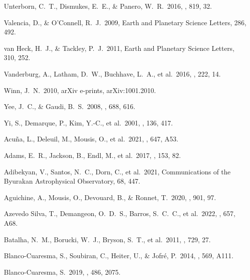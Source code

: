  Unterborn, C.~T., Dismukes, E.~E., \& Panero, W.~R.\ 2016, \apj, 819, 32.

 Valencia, D., \& O'Connell, R.~J.\ 2009, Earth and Planetary Science Letters, 286, 492.

 van Heck, H.~J., \& Tackley, P.~J.\ 2011, Earth and Planetary Science Letters, 310, 252.

 Vanderburg, A., Latham, D.~W., Buchhave, L.~A., et al.\ 2016, \apjs, 222, 14.

 Winn, J.~N.\ 2010, arXiv e-prints, arXiv:1001.2010.

 Yee, J.~C., \& Gaudi, B.~S.\ 2008, \apj, 688, 616.

 Yi, S., Demarque, P., Kim, Y.-C., et al.\ 2001, \apjs, 136, 417.



 Acu{\~n}a, L., Deleuil, M., Mousis, O., et al.\ 2021, \aap, 647, A53.

 Adams, E.~R., Jackson, B., Endl, M., et al.\ 2017, \aj, 153, 82.

 Adibekyan, V., Santos, N.~C., Dorn, C., et al.\ 2021, Communications of the Byurakan Astrophysical Observatory, 68, 447.

 Aguichine, A., Mousis, O., Devouard, B., \& Ronnet, T.\ 2020, \apj, 901, 97.

 Azevedo Silva, T., Demangeon, O.~D.~S., Barros, S.~C.~C., et al.\ 2022, \aap, 657, A68.

 Batalha, N.~M., Borucki, W.~J., Bryson, S.~T., et al.\ 2011, \apj, 729, 27.

 Blanco-Cuaresma, S., Soubiran, C., Heiter, U., \& Jofr{\'e}, P.\ 2014, \aap, 569, A111.

 Blanco-Cuaresma, S.\ 2019, \mnras, 486, 2075.

